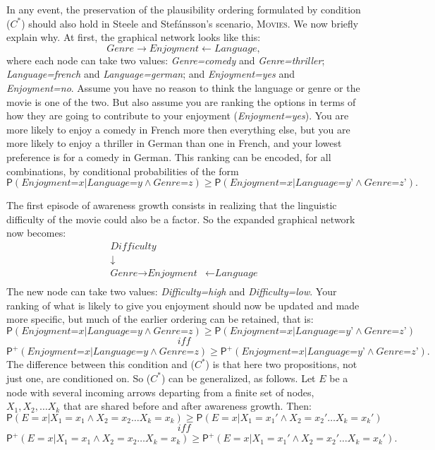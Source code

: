\documentclass[
  11pt,
  dvipsnames,enabledeprecatedfontcommands]{scrartcl}
\newcommand{\pr}[1]{\ensuremath{\mathsf{P}(#1)}}
\newcommand{\ppr}[2]{\ensuremath{\mathsf{P}^{#1}(#2)}}
\begin{document}
In any event, the preservation of the plausibility ordering formulated
by condition (\(C^*\)) should also hold in Steele and Stefánsson's
scenario, \textsc{Movies}. We now briefly explain why. At first, the
graphical network looks like this:
\[\textit{Genre} \rightarrow \textit{Enjoyment} \leftarrow \textit{Language},\]
where each node can take two values: \textit{Genre=comedy} and
\textit{Genre=thriller}; \textit{Language=french} and
\textit{Language=german}; and \textit{Enjoyment=yes} and
\textit{Enjoyment=no}. Assume you have no reason to think the language
or genre or the movie is one of the two. But also assume you are ranking
the options in terms of how they are going to contribute to your
enjoyment (\textit{Enjoyment=yes}). You are more likely to enjoy a
comedy in French more then everything else, but you are more likely to
enjoy a thriller in German than one in French, and your lowest
preference is for a comedy in German. This ranking can be encoded, for
all combinations, by conditional probabilities of the form
\[\pr{\textit{Enjoyment=x} \vert \textit{Language=y} \wedge \textit{Genre=z}} \geq \pr{\textit{Enjoyment=x} \vert \textit{Language=y'} \wedge \textit{Genre=z'}}.\]

The first episode of awareness growth consists in realizing that the
linguistic difficulty of the movie could also be a factor. So the
expanded graphical network now becomes: \begin{align*}
\textit{Difficulty} &\\
\downarrow \\
\textit{Genre} \rightarrow \textit{Enjoyment} &\leftarrow \textit{Language}\\
\end{align*} \noindent The new node can take two values:
\textit{Difficulty=high} and \textit{Difficulty=low}. Your ranking of
what is likely to give you enjoyment should now be updated and made more
specific, but much of the earlier ordering can be retained, that is:
\[\pr{\textit{Enjoyment=x} \vert \textit{Language=y} \wedge \textit{Genre=z}} \geq \pr{\textit{Enjoyment=x} \vert \textit{Language=y'} \wedge \textit{Genre=z'}}\]
\[\textit{ iff }\]
\[\ppr{+}{\textit{Enjoyment=x} \vert \textit{Language=y} \wedge \textit{Genre=z}} \geq \ppr{+}{\textit{Enjoyment=x} \vert \textit{Language=y'} \wedge \textit{Genre=z'}}.\]
The difference between this condition and (\(C^*\)) is that here two
propositions, not just one, are conditioned on. So (\(C^*\)) can be
generalized, as follows. Let \(E\) be a node with several incoming
arrows departing from a finite set of nodes, \(X_1, X_2, \dots X_k\)
that are shared before and after awareness growth. Then:
\[\pr{E=x \vert X_1=x_1 \wedge X_2=x_2 \dots X_k=x_k} \geq \pr{E=x \vert X_1=x_1' \wedge X_2=x_2' \dots X_k=x_k'}\]
\[\textit{ iff }\]
\[\ppr{+}{E=x \vert X_1=x_1 \wedge X_2=x_2 \dots X_k=x_k} \geq \ppr{+}{E=x \vert X_1=x_1' \wedge X_2=x_2' \dots X_k=x_k'}.\]
\end{document}

